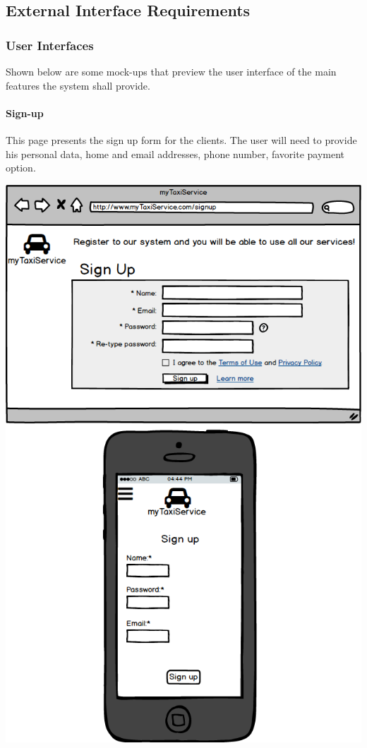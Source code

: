 \documentclass[a4paper,11pt]{report} %
\begin{document}
	\subsection{External Interface Requirements} 
	
	\subsubsection{User Interfaces} Shown below are some mock-ups that preview the user interface of the main features the system shall provide.
	
	\pagebreak
	\paragraph{Sign-up} This page presents the sign up form for the clients. The user will need to provide his personal data, home and email addresses, phone number, favorite payment option.
	\begin{center}
		\includegraphics[width=0.9\linewidth]{Pictures/Signup}
	\end{center}
	\pagebreak
	
\end{document}
